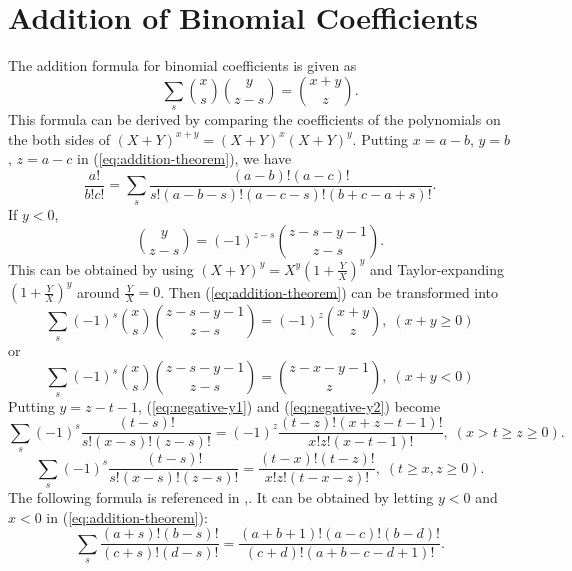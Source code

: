 \documentclass{article}
\begin{document}
{\section{Addition of Binomial Coefficients}
\label{sec-7}
The addition formula for binomial coefficients is given as
\begin{equation}
\label{eq:addition-theorem}
\sum_{s} \binom{x}{s} \binom{y}{z-s} = \binom{x+y}{z}.
\end{equation}
This formula can be derived by comparing the coefficients of the polynomials on the both sides of $(X+Y)^{x+y}=(X+Y)^{x}(X+Y)^{y}$.
Putting $x = a-b$, $y=b$, $z=a-c$ in (\ref{eq:addition-theorem}), we have
\begin{equation}
\label{fml:triple-formula}
\frac{a!}{b!c!}= \sum_{s} \frac{(a-b)!(a-c)!}{s!(a-b-s)!(a-c-s)!(b+c-a+s)!}.
\end{equation}
If $y < 0$, 
\begin{equation}
\label{sub:negative-y}
\binom{y}{z-s} = (-1)^{z-s} \binom{z-s-y-1}{z-s}.
\end{equation}
This can be obtained by using $(X+Y)^{y}=X^{y}(1+\frac{Y}{X})^{y}$ and Taylor-expanding $(1+\frac{Y}{X})^{y}$ around $\frac{Y}{X}=0$.
Then (\ref{eq:addition-theorem}) can be transformed into
\begin{equation}
\label{eq:negative-y1}
\sum_{s}(-1)^{s} \binom{x}{s} \binom{z-s-y-1}{z-s} = (-1)^{z}\binom{x+y}{z}, \; (x+y \ge 0)
\end{equation}
or
\begin{equation}
\label{eq:negative-y2}
\sum_{s}(-1)^{s} \binom{x}{s} \binom{z-s-y-1}{z-s} = \binom{z-x-y-1}{z}, \;(x+y < 0)
\end{equation}
Putting $y=z-t-1$, (\ref{eq:negative-y1}) and (\ref{eq:negative-y2}) become
\begin{equation}
\label{ }
\sum_{s} (-1)^{s}\frac{(t-s)!}{s!(x-s)!(z-s)!}= (-1)^z \frac{(t-z)!(x+z-t-1)!}{x!z!(x-t-1)!}, \;( x > t \ge z \ge 0).
\end{equation}
\begin{equation}
\label{}
\sum_{s} (-1)^{s}\frac{(t-s)!}{s!(x-s)!(z-s)!}= \frac{(t-x)!(t-z)!}{x!z!(t-x-z)!}, \; (t \ge x,z \ge 0).
\end{equation}
The following formula is referenced in \cite{Messiah},\cite{Racah}. It can be obtained by letting $y <0$ and $x<0$ in (\ref{eq:addition-theorem}):
\begin{equation}
\label{eq:general_binomial_coeff}
\sum_{s} \frac{(a+s)!(b-s)!}{(c+s)!(d-s)!} = \frac{(a+b+1)!(a-c)!(b-d)!}{(c+d)!(a+b-c-d+1)!}.

\end{equation}}
\end{document}
